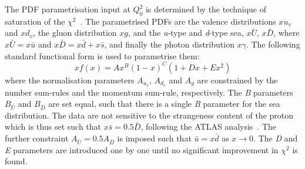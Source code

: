 The PDF parametrisation input at $Q^2_0$ is determined by the technique of saturation of the $\chi^{2}$~\cite{h1chisqsat}.
The parametrised PDFs are the valence distributions $xu_{v}$ and $xd_{v}$, the gluon distribution $xg$, and the \textit{u}-type and \textit{d}-type sea, $x\bar{U}$, $x\bar{D}$, where $x\bar{U} = x\bar{u}$ and $x\bar{D} = x\bar{d} + x\bar{s}$, and finally the photon distribution $x\gamma$. The following standard functional form is used to parametrise them:
\begin{equation}
xf(x) = Ax^{B}(1-x)^{C}(1+Dx+Ex^{2})
\end{equation}
where the normalisation parameters $A_{u_{v}}$, $A_{d_{v}}$ and $A_{g}$ are constrained by the number sum-rules and the 
momentum sum-rule, respectively. The \textit{B} parameters $B_{\bar{U}}$ and $B_{\bar{D}}$ are set equal, such that there 
is a single \textit{B} parameter for the sea distribution. The data are not sensitive to the 
strangeness content of the proton which is thus set such that $x\bar{s} = 0.5\bar{D}$, following the ATLAS 
analysis~\cite{atlasstrange}. The further constraint $A_{\bar{U}} = 0.5 A_{\bar{D}}$ is imposed such that $\bar{u}=x\bar{d}$ as $x \to 0$.
The \textit{D} and \textit{E} parameters are introduced one by one until no significant 
improvement in $\chi^{2}$ is found. 

